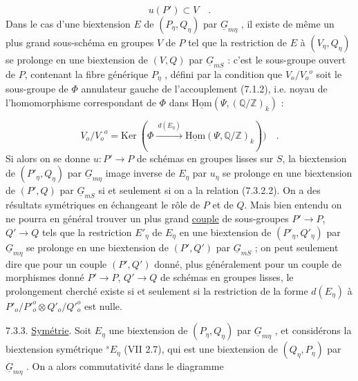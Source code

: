 \begin{equation}\tag{7.3.2.2}
u(P') \subset V \quad .
\end{equation}
Dans le cas d'une biextension $E$ de $(P_\eta , Q_\eta)$ par $\underline{G}_{m\eta}$ , il existe de même un plus grand sous-schéma en groupes $V$ de $P$ tel que la restriction de $E$ à $(V_\eta , Q_\eta)$ se prolonge en une biextension de $(V,Q)$ par $\underline{G}_{mS}$ : c'est le sous-groupe ouvert de $P$, contenant la fibre générique $P_\eta$ , défini par la condition que $V_o/{V_o}^{o}$ soit le sous-groupe de $\Phi$ annulateur gauche de l'accouplement (7.1.2), i.e. noyau de l'homomorphisme correspondant de $\Phi$ dans $\underline{\mathrm{Hom}}(\Psi, (\mathbb{Q}/\mathbb{Z})_k)$ :

\begin{equation}\tag{7.3.2.3}
V_o/{V_o}^{o} = \mathrm{Ker}\ (\Phi \xrightarrow{\ d(E_\eta)\ } \underline{\mathrm{Hom}}(\Psi ,\mathbb{Q}/\mathbb{Z} )_k)) \quad .
\end{equation}
Si alors on se donne $u: P' \longrightarrow P$ de schémas en groupes lisses sur $S$, la biextension de $(P'_\eta , Q_\eta)$ par $\underline{G}_{m\eta}$ image inverse de $E_\eta$ par $u_\eta$ se prolonge en une biextension de $(P',Q)$ par $\underline{G}_{mS}$ si et seulement si on a la relation (7.3.2.2). On a des résultats symétriques en échangeant le rôle de $P$ et de $Q$. Mais bien entendu on ne pourra en général trouver un plus grand \underline{couple} de sous-groupes $P' \longrightarrow P$, $Q' \longrightarrow Q$ tels que la restriction $E'_\eta$ de $E_\eta$ en une biextension de $(P'_\eta , Q'_\eta)$ par $\underline{G}_{m\eta}$ se prolonge en une biextension de $(P',Q')$ par $\underline{G}_{mS}$ ; on peut seulement dire que pour un couple
$(P',Q')$ donné, plus généralement pour un couple de morphismes donné $P' \longrightarrow P$, $Q' \longrightarrow Q$ de schémas en groupes lisses, le prolongement cherché existe si et seulement si la restriction de la forme $d(E_\eta)$ à $P'_o/P'^o_o \otimes Q'_o/Q'^o_o$ est nulle.

7.3.3. \underline{Symétrie}. Soit $E_\eta$ une biextension de $(P_\eta , Q_\eta)$ par $\underline{G}_{m\eta}$ , et considérons la biextension symétrique ${}^{s}E_\eta$ (VII 2.7), qui est une biextension de $(Q_\eta , P_\eta)$ par $\underline{G}_{m\eta}$ . On a alors commutativité dans le diagramme

